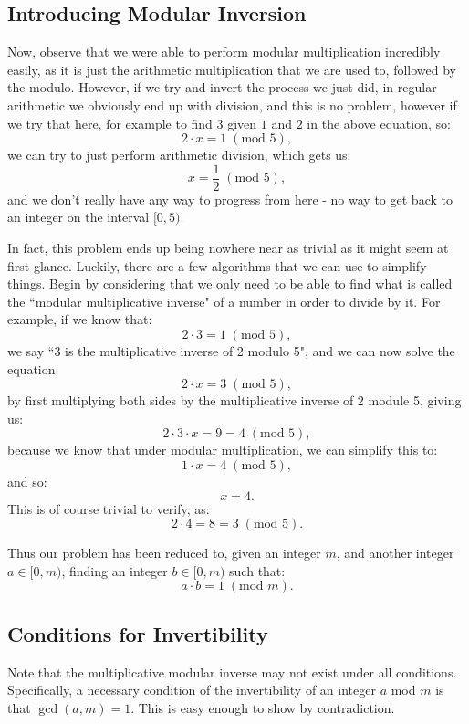 \documentclass{article}
\begin{document}
\subsection{Introducing Modular Inversion}
Now, observe that we were able to perform modular multiplication incredibly easily, as it is just the arithmetic multiplication that we are used to, followed by the modulo. However, if we try and invert the process we just did, in regular arithmetic we obviously end up with division, and this is no problem, however if we try that here, for example to find $3$ given $1$ and $2$ in the above equation, so:
\[
    2 \cdot x = 1 \; (\text{mod } 5),
\]
we can try to just perform arithmetic division, which gets us:
\[
    x = \frac{1}{2} \; (\text{mod } 5),
\]
and we don't really have any way to progress from here - no way to get back to an integer on the interval $[0, 5)$. \medskip

\noindent In fact, this problem ends up being nowhere near as trivial as it might seem at first glance. Luckily, there are a few algorithms that we can use to simplify things. Begin by considering that we only need to be able to find what is called the ``modular multiplicative inverse" of a number in order to divide by it. For example, if we know that:
\[
    2 \cdot 3 = 1 \; (\text{mod } 5),
\]
we say ``3 is the multiplicative inverse of 2 modulo 5", and we can now solve the equation:
\[
    2 \cdot x = 3 \; (\text{mod } 5),
\]
by first multiplying both sides by the multiplicative inverse of $2$ module 5, giving us:
\[
    2 \cdot 3 \cdot x = 9 = 4 \; (\text{mod } 5),
\]
because we know that under modular multiplication, we can simplify this to:
\[
    1 \cdot x = 4 \; (\text{mod } 5),
\]
and so:
\[
    x = 4.
\]
This is of course trivial to verify, as:
\[
    2 \cdot 4 = 8 = 3 \; (\text{mod } 5).
\]

Thus our problem has been reduced to, given an integer $m$, and another integer $a \in [0, m)$, finding an integer $b \in [0, m)$ such that:
\[
    a \cdot b = 1 \; (\text{mod } m).
\]

\subsection{Conditions for Invertibility}
Note that the multiplicative modular inverse may not exist under all conditions. Specifically, a necessary condition of the invertibility of an integer $a$ mod $m$ is that $\gcd(a, m) = 1$. This is easy enough to show by contradiction. \medskip
\end{document}
